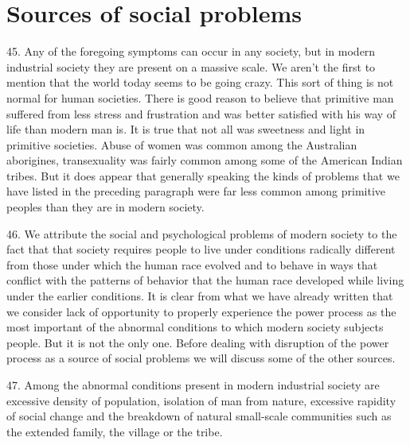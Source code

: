 \documentclass{article}
\begin{document}
\section{Sources of social problems}

\hspace{0.5cm} 45.  Any of the foregoing symptoms can occur in any society, but in modern industrial society they 
are present on a massive scale.  We aren’t the first to mention that the world today seems to be 
going crazy.  This sort of thing is not normal for human societies.  There is good reason to believe 
that primitive man suffered from less stress and frustration and was better satisfied with his way 
of  life  than  modern  man  is.   It  is  true  that  not  all  was  sweetness  and  light  in  primitive  
societies.  Abuse of women was common among the Australian aborigines, transexuality was fairly 
common among some of the American Indian tribes.  But it does appear that generally speaking 
the kinds of problems that we have listed in the preceding paragraph were far less common among 
primitive peoples than they are in modern society. \vspace{\baselineskip}

46.  We  attribute  the  social  and  psychological  problems  of  modern  society  to  the  fact  that  that  
society  requires  people  to  live  under  conditions  radically  different  from  those  under  which  the  
human  race  evolved  and  to  behave  in  ways  that  conflict  with  the  patterns  of  behavior  that  the  
human  race  developed  while  living  under  the  earlier  conditions.   It  is  clear  from  what  we  have  
already written that we consider lack of opportunity to properly experience the power process as 
the most important of the abnormal conditions to which modern society subjects people.  But it is 
not  the  only  one.   Before  dealing  with  disruption  of  the  power  process  as  a  source  of  social  
problems we will discuss some of the other sources. \vspace{\baselineskip}

47.  Among the abnormal conditions present in modern industrial society are excessive density of 
population, isolation of man from nature, excessive rapidity of social change and the breakdown 
of natural small-scale communities such as the extended family, the village or the tribe. \vspace{\baselineskip}
\end{document}
